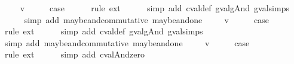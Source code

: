 \begin{isabellebody}
\isamarkupfalse%
\isanewline
\ \ \isamarkupfalse%
\ {\isacharparenleft}{\isachardoublequoteopen}{}{\isacharunderscore}{}{\isachardoublequoteclose}\ v{\isacharparenright}\isanewline
\ \ \isamarkupfalse%
\ \isamarkupfalse%
\ {\isacharquery}case\isanewline
\ \ \ \ \isamarkupfalse%
\ {\isacharparenleft}rule\ ext{\isacharparenright}{\isacharplus}\isanewline
\ \ \ \ \isamarkupfalse%
\ {\isacharparenleft}simp\ add{\isacharcolon}\ cval{\isacharunderscore}def\ gval{\isacharunderscore}gAnd\ gval{\isachardot}simps{\isacharparenleft}{}{\isacharparenright}{\isacharparenright}\isanewline
\ \ \ \ \isamarkupfalse%
\ {\isacharparenleft}simp\ add{\isacharcolon}\ maybe{\isacharunderscore}and{\isacharunderscore}commutative\ maybe{\isacharunderscore}and{\isacharunderscore}one{\isacharparenright}\isanewline
{}\isamarkupfalse%
\isanewline
\ \ \isamarkupfalse%
\ {\isacharparenleft}{\isachardoublequoteopen}{}{\isacharunderscore}{}{\isachardoublequoteclose}\ v{\isacharparenright}\isanewline
\ \ \isamarkupfalse%
\ \isamarkupfalse%
\ {\isacharquery}case\isanewline
\ \ \ \ \isamarkupfalse%
\ {\isacharparenleft}rule\ ext{\isacharparenright}{\isacharplus}\isanewline
\ \ \ \ \isamarkupfalse%
\ {\isacharparenleft}simp\ add{\isacharcolon}\ cval{\isacharunderscore}def\ gval{\isacharunderscore}gAnd\ gval{\isachardot}simps{\isacharparenleft}{}{\isacharparenright}{\isacharparenright}\isanewline
\ \ \ \ \isamarkupfalse%
\ {\isacharparenleft}simp\ add{\isacharcolon}\ maybe{\isacharunderscore}and{\isacharunderscore}commutative\ maybe{\isacharunderscore}and{\isacharunderscore}one{\isacharparenright}\isanewline
{}\isamarkupfalse%
\isanewline
\ \ \isamarkupfalse%
\ {\isacharparenleft}{\isachardoublequoteopen}{}{\isacharunderscore}{}{\isachardoublequoteclose}\ v{\isacharparenright}\isanewline
\ \ \isamarkupfalse%
\ \isamarkupfalse%
\ {\isacharquery}case\isanewline
\ \ \ \ \isamarkupfalse%
\ {\isacharparenleft}rule\ ext{\isacharparenright}{\isacharplus}\isanewline
\ \ \ \ \isamarkupfalse%
\ {\isacharparenleft}simp\ add{\isacharcolon}\ cval{\isacharunderscore}And{\isacharunderscore}zero{\isacharparenright}\isanewline
{}\isamarkupfalse%
\isanewline
\ \ \isamarkupfalse%

\end{isabellebody}
